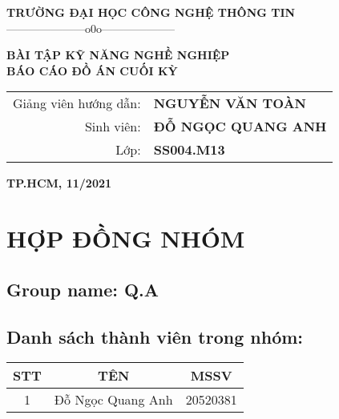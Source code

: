 \documentclass[a4paper,14pt]{extreport}
\begin{document}
\fontsize{13pt}{18pt}\selectfont

\setlength{\baselineskip}{18truept}

\begin{titlepage} 

\begin{center}

{\large\bf TRƯỜNG ĐẠI HỌC CÔNG NGHỆ THÔNG TIN}\\


{———————o0o——————–}

\vskip 4cm

{\bf BÀI TẬP KỸ NĂNG NGHỀ NGHIỆP}\\[1cm]

{\Large\bf \textbf{BÁO CÁO ĐỒ ÁN CUỐI KỲ}}\\

\vskip 1cm



\vskip 5cm

\begin{tabular}{r l}

Giảng viên hướng dẫn:&{\bf NGUYỄN VĂN TOÀN}\\[0.5cm]

Sinh viên:&{\bf  ĐỖ NGỌC QUANG ANH}\\[0.5cm]

Lớp:&{\bf SS004.M13}

\end{tabular}

\vfill

{\bf TP.HCM, 11/2021}

\end{center}

\end{titlepage}



\chapter{HỢP ĐỒNG NHÓM} %


\section{Group name: Q.A}
\section{Danh sách thành viên trong nhóm:}
\begin{tabular}{|c|c|c|}
\hline
STT& TÊN & MSSV\\

\hline
1& Đỗ Ngọc Quang Anh& 20520381\\
\hline
\end{tabular}
\end{document}
